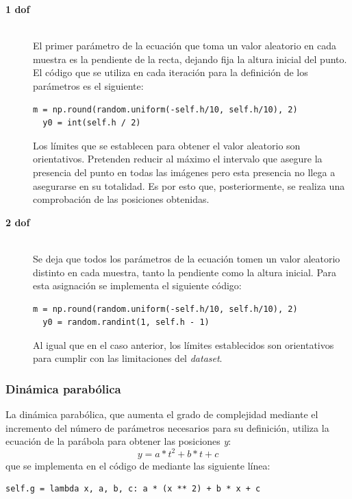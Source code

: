 \begin{description}
\item[\textbf{1 \acrshort{dof}}] \hfill 
\vspace{10pt}
\\
El primer parámetro de la ecuación que toma un valor aleatorio en cada muestra es la pendiente de la recta, dejando fija la altura inicial del punto. El código que se utiliza en cada iteración para la definición de los parámetros es el siguiente:
\vspace{10pt}
\begin{lstlisting}[frame=single]
  m = np.round(random.uniform(-self.h/10, self.h/10), 2)
  y0 = int(self.h / 2)
\end{lstlisting}
Los límites que se establecen para obtener el valor aleatorio son orientativos. Pretenden reducir al máximo el intervalo que asegure la presencia del punto en todas las imágenes pero esta presencia no llega a asegurarse en su totalidad. Es por esto que, posteriormente, se realiza una comprobación de las posiciones obtenidas.
\vspace{90pt}
	
\item[\textbf{2 \acrshort{dof}}] \hfill 
\vspace{10pt}
\\
Se deja que todos los parámetros de la ecuación tomen un valor aleatorio distinto en cada muestra, tanto la pendiente como la altura inicial. Para esta asignación se implementa el siguiente código:
\vspace{10pt}
\begin{lstlisting}[frame=single]
  m = np.round(random.uniform(-self.h/10, self.h/10), 2)
  y0 = random.randint(1, self.h - 1)
\end{lstlisting}
Al igual que en el caso anterior, los límites establecidos son orientativos para cumplir con las limitaciones del \textit{dataset}.
\vspace{10pt}

\end{description}

\subsubsection{Dinámica parabólica}

La dinámica parabólica, que aumenta el grado de complejidad mediante el incremento del número de parámetros necesarios para su definición, utiliza la ecuación de la parábola para obtener las posiciones \textit{y}:
$$y = a*t^2 + b*t + c$$
que se implementa en el código de mediante las siguiente línea:
\vspace{10pt}
\begin{lstlisting}[frame=single]
  self.g = lambda x, a, b, c: a * (x ** 2) + b * x + c
\end{lstlisting}

